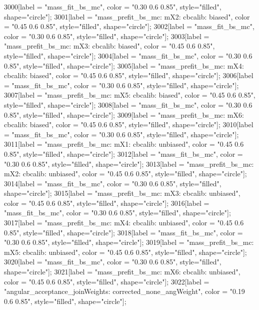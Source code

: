 {	3000[label = "mass_fit_bs_mc", color = "0.30 0.6 0.85", style="filled", shape="circle"];
	3001[label = "mass_prefit_bs_mc\nmassbin: mX2\nmassmodel: cbcalib\ntrigger: biased", color = "0.45 0.6 0.85", style="filled", shape="circle"];
	3002[label = "mass_fit_bs_mc", color = "0.30 0.6 0.85", style="filled", shape="circle"];
	3003[label = "mass_prefit_bs_mc\nmassbin: mX3\nmassmodel: cbcalib\ntrigger: biased", color = "0.45 0.6 0.85", style="filled", shape="circle"];
	3004[label = "mass_fit_bs_mc", color = "0.30 0.6 0.85", style="filled", shape="circle"];
	3005[label = "mass_prefit_bs_mc\nmassbin: mX4\nmassmodel: cbcalib\ntrigger: biased", color = "0.45 0.6 0.85", style="filled", shape="circle"];
	3006[label = "mass_fit_bs_mc", color = "0.30 0.6 0.85", style="filled", shape="circle"];
	3007[label = "mass_prefit_bs_mc\nmassbin: mX5\nmassmodel: cbcalib\ntrigger: biased", color = "0.45 0.6 0.85", style="filled", shape="circle"];
	3008[label = "mass_fit_bs_mc", color = "0.30 0.6 0.85", style="filled", shape="circle"];
	3009[label = "mass_prefit_bs_mc\nmassbin: mX6\nmassmodel: cbcalib\ntrigger: biased", color = "0.45 0.6 0.85", style="filled", shape="circle"];
	3010[label = "mass_fit_bs_mc", color = "0.30 0.6 0.85", style="filled", shape="circle"];
	3011[label = "mass_prefit_bs_mc\nmassbin: mX1\nmassmodel: cbcalib\ntrigger: unbiased", color = "0.45 0.6 0.85", style="filled", shape="circle"];
	3012[label = "mass_fit_bs_mc", color = "0.30 0.6 0.85", style="filled", shape="circle"];
	3013[label = "mass_prefit_bs_mc\nmassbin: mX2\nmassmodel: cbcalib\ntrigger: unbiased", color = "0.45 0.6 0.85", style="filled", shape="circle"];
	3014[label = "mass_fit_bs_mc", color = "0.30 0.6 0.85", style="filled", shape="circle"];
	3015[label = "mass_prefit_bs_mc\nmassbin: mX3\nmassmodel: cbcalib\ntrigger: unbiased", color = "0.45 0.6 0.85", style="filled", shape="circle"];
	3016[label = "mass_fit_bs_mc", color = "0.30 0.6 0.85", style="filled", shape="circle"];
	3017[label = "mass_prefit_bs_mc\nmassbin: mX4\nmassmodel: cbcalib\ntrigger: unbiased", color = "0.45 0.6 0.85", style="filled", shape="circle"];
	3018[label = "mass_fit_bs_mc", color = "0.30 0.6 0.85", style="filled", shape="circle"];
	3019[label = "mass_prefit_bs_mc\nmassbin: mX5\nmassmodel: cbcalib\ntrigger: unbiased", color = "0.45 0.6 0.85", style="filled", shape="circle"];
	3020[label = "mass_fit_bs_mc", color = "0.30 0.6 0.85", style="filled", shape="circle"];
	3021[label = "mass_prefit_bs_mc\nmassbin: mX6\nmassmodel: cbcalib\ntrigger: unbiased", color = "0.45 0.6 0.85", style="filled", shape="circle"];
	3022[label = "angular_acceptance_joinWeights\nwflag: corrected_none_angWeight", color = "0.19 0.6 0.85", style="filled", shape="circle"];
}
